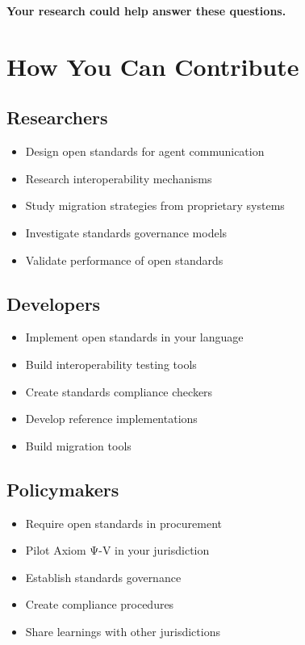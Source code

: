 \textbf{Your research could help answer these questions.}

\vspace{0.5cm}

\section{How You Can Contribute}

\subsection{Researchers}

\begin{itemize}
    \item Design open standards for agent communication
    \item Research interoperability mechanisms
    \item Study migration strategies from proprietary systems
    \item Investigate standards governance models
    \item Validate performance of open standards
\end{itemize}

\subsection{Developers}

\begin{itemize}
    \item Implement open standards in your language
    \item Build interoperability testing tools
    \item Create standards compliance checkers
    \item Develop reference implementations
    \item Build migration tools
\end{itemize}

\subsection{Policymakers}

\begin{itemize}
    \item Require open standards in procurement
    \item Pilot Axiom Ψ-V in your jurisdiction
    \item Establish standards governance
    \item Create compliance procedures
    \item Share learnings with other jurisdictions
\end{itemize}

